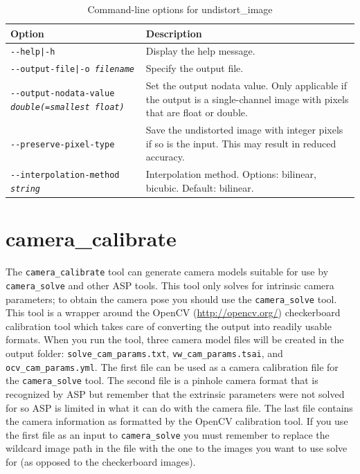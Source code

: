 \begin{longtable}{|l|p{7.5cm}|}
\caption{Command-line options for undistort\_image}
\label{tbl:undistortimage}
\endfirsthead
\endhead
\endfoot
\endlastfoot
\hline
Option & Description \\ \hline \hline
\texttt{-\/-help|-h} & Display the help message. \\ \hline
\texttt{-\/-output-file|-o \textit{filename}} & Specify the output file. \\ \hline
\texttt{-\/-output-nodata-value \textit{double(=smallest float)}} & 
Set the output nodata value. Only applicable if the output is a single-channel 
image with pixels that are float or double.  \\ \hline

\texttt{-\/-preserve-pixel-type} & 
Save the undistorted image with integer pixels if so is the input. This may 
result in reduced accuracy.
\\ \hline

\texttt{-\/-interpolation-method \textit{string}} & 
Interpolation method. Options: bilinear, bicubic. Default: bilinear. 
\\ \hline

\end{longtable}

\section{camera\_calibrate}
\label{cameracalibrate}

The \texttt{camera\_calibrate} tool can generate camera models suitable for use by \texttt{camera\_solve}
and other ASP tools.  This tool only solves for intrinsic camera parameters; to obtain the camera pose you
should  use the \texttt{camera\_solve} tool.  This tool is a wrapper around the OpenCV (\url{http://opencv.org/})
checkerboard calibration tool which takes care of converting the output into readily usable formats.  When you
run the tool, three camera model files will be created in the output folder:
\texttt{solve\_cam\_params.txt}, \texttt{vw\_cam\_params.tsai}, and \texttt{ocv\_cam\_params.yml}.
The first file can be used as a camera calibration file for the \texttt{camera\_solve} tool.  The second file
is a pinhole camera format that is recognized by ASP but remember that the extrinsic parameters were not solved
for so ASP is limited in what it can do with the camera file.  The last file contains the camera information as
formatted by the OpenCV calibration tool.  If you use the first file as an input to \texttt{camera\_solve}
you must remember to replace the wildcard image path in the file with the one to the images you want to use
solve for (as opposed to the checkerboard images).

